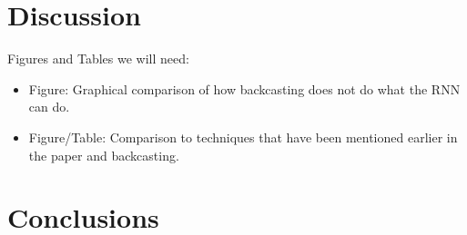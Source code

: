 \documentclass[sigconf]{acmart}
\begin{document}
\section{Discussion}
\label{sec:discussion}

Figures and Tables we will need:
\begin{itemize}
	\item Figure: Graphical comparison of how backcasting does not do what the RNN can do.
	\item Figure/Table: Comparison to techniques that have been mentioned earlier in the paper and backcasting.
\end{itemize}

\section{Conclusions}
\label{sec:conclusions}


%	
%



%

\end{document}
